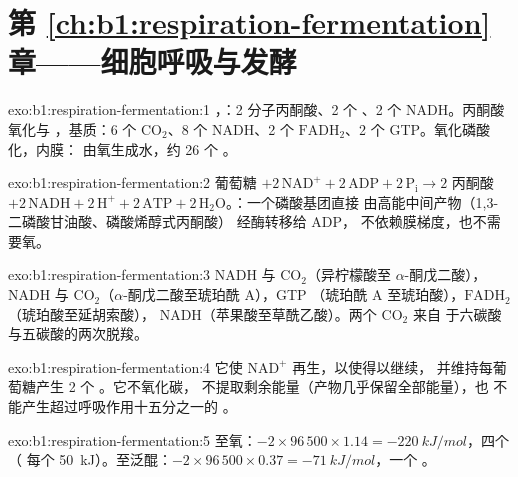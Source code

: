 \section*{第 \ref{ch:b1:respiration-fermentation} 章——细胞呼吸与发酵}

\begin{solution}{exo:b1:respiration-fermentation:1}
，：2 分子丙酮酸、2 个 、2 个 NADH。丙酮酸氧化与
，基质：6 个 $\mathrm{CO_2}$、8 个 NADH、2
个 $\mathrm{FADH_2}$、2 个 GTP。氧化磷酸化，内膜：
由氧生成水，约 26 个 。
\end{solution}

\begin{solution}{exo:b1:respiration-fermentation:2}
葡萄糖 $+ 2\,\mathrm{NAD^+} + 2\,\mathrm{ADP} + 2\,\mathrm{P_i} \to
2$ 丙酮酸 $+ 2\,\mathrm{NADH} + 2\,\mathrm{H^+} + 2\,\mathrm{ATP} +
2\,\mathrm{H_2O}$。：一个磷酸基团直接
由高能中间产物（1,3-二磷酸甘油酸、磷酸烯醇式丙酮酸）
经酶转移给 ADP，
不依赖膜梯度，也不需要氧。
\end{solution}

\begin{solution}{exo:b1:respiration-fermentation:3}
NADH 与 $\mathrm{CO_2}$（异柠檬酸至 $\alpha$-酮戊二酸），NADH
与 $\mathrm{CO_2}$（$\alpha$-酮戊二酸至琥珀酰 A），GTP
（琥珀酰 A 至琥珀酸），$\mathrm{FADH_2}$（琥珀酸至延胡索酸），
NADH（苹果酸至草酰乙酸）。两个 $\mathrm{CO_2}$ 来自
于六碳酸与五碳酸的两次脱羧。
\end{solution}

\begin{solution}{exo:b1:respiration-fermentation:4}
它使 $\mathrm{NAD^+}$ 再生，以使得以继续，
并维持每葡萄糖产生 2 个 。它不氧化碳，
不提取剩余能量（产物几乎保留全部能量），也
不能产生超过呼吸作用十五分之一的 。
\end{solution}

\begin{solution}{exo:b1:respiration-fermentation:5}
至氧：$-2\times 96\,500\times 1.14 = \qty{-220}{kJ/mol}$，四个 （
每个 \qty{50}{kJ}）。至泛醌：$-2\times 96\,500\times 0.37 =
\qty{-71}{kJ/mol}$，一个 。
\end{solution}

